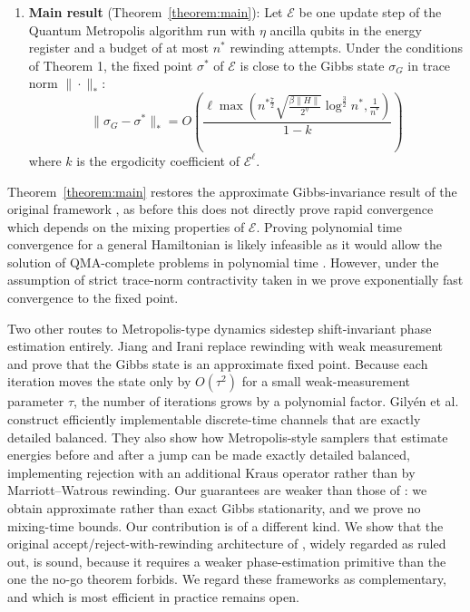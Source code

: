 \documentclass[aps,floatfix,10pt,amssymb,amsfont,amsmath,superscriptaddress,float,nofootinbib,longbibliography,nobalancelastpage,twocolumn]{revtex4-2}
\begin{document}
\begin{enumerate}
    \item \textbf{Main result} (Theorem~\ref{theorem:main}): Let $\mathcal{E}$ be one  update step of the Quantum Metropolis algorithm run with $\eta$ ancilla qubits in the energy register and a budget of at most $n^*$ rewinding attempts. Under the conditions of Theorem 1, the fixed point $\sigma^*$ of $\mathcal{E}$ is close to the Gibbs state $\sigma_G$ in trace norm $\|\cdot\|_*$:
    \begin{equation}
       \|\sigma_G- \sigma^*\|_* = O\left(\frac{\ell\max\left( n^{*\frac{7}{2}}\sqrt{\frac{\beta\|H\| }{2^{\eta}}}\log^{\frac{3}{2}}n^*,\frac{1}{n^*}\right)}{1-k}\right)
    \end{equation}
    where $k$ is the ergodicity coefficient of $\mathcal{E}^\ell$.
\end{enumerate}
Theorem~\ref{theorem:main} restores the approximate Gibbs-invariance result of the original framework \cite{Temme_2011}, as before this does not directly prove rapid convergence which depends on the mixing properties of $\mathcal{E}$. Proving polynomial time convergence for a general Hamiltonian is likely infeasible as it would allow the solution of QMA-complete problems in polynomial time \cite{kempe2006complexity}. However, under the assumption of strict trace-norm contractivity taken in \cite{Temme_2011} we prove exponentially fast convergence to the fixed point.

Two other routes to Metropolis-type dynamics sidestep shift-invariant phase estimation entirely. Jiang and Irani \cite{jiang2024quantummetropolissamplingweak} replace rewinding with weak measurement and prove that the Gibbs state is an approximate fixed point. Because each iteration moves the state only by $O(\tau^2)$ for a small weak-measurement parameter $\tau$, the number of iterations grows by a polynomial factor. Gilyén et al. \cite{gilyen2024quantum} construct efficiently implementable discrete-time channels that are exactly detailed balanced. They also show how Metropolis-style samplers that estimate energies before and after a jump can be made exactly detailed balanced, implementing rejection with an additional Kraus operator rather than by Marriott–Watrous rewinding. Our guarantees are weaker than those of \cite{gilyen2024quantum}: we obtain approximate rather than exact Gibbs stationarity, and we prove no mixing-time bounds. Our contribution is of a different kind. We show that the original accept/reject-with-rewinding architecture of \cite{Temme_2011}, widely regarded as ruled out, is sound, because it requires a weaker phase-estimation primitive than the one the no-go theorem \cite{chen2023quantumthermalstatepreparation} forbids. We regard these frameworks as complementary, and which is most efficient in practice remains open.
\end{document}
